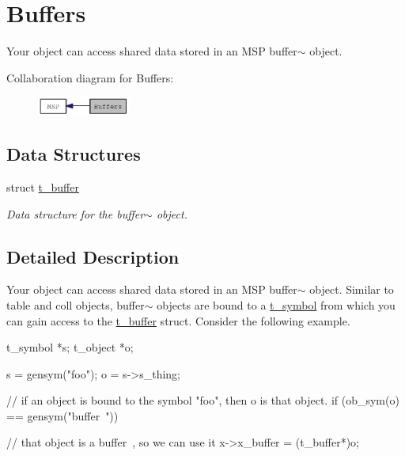 \hypertarget{group__buffers}{
\section{Buffers}
\label{group__buffers}
}


Your object can access shared data stored in an MSP buffer$\sim$ object.  


Collaboration diagram for Buffers:\nopagebreak
\begin{figure}[H]
\begin{center}
\leavevmode
\includegraphics[width=86pt]{group__buffers}
\end{center}
\end{figure}
\subsection*{Data Structures}
\begin{DoxyCompactItemize}
\item 
struct \hyperlink{structt__buffer}{t\_\-buffer}
\begin{DoxyCompactList}\small\item\em Data structure for the buffer$\sim$ object. \item\end{DoxyCompactList}\end{DoxyCompactItemize}


\subsection{Detailed Description}
Your object can access shared data stored in an MSP buffer$\sim$ object. Similar to table and coll objects, buffer$\sim$ objects are bound to a \hyperlink{structt__symbol}{t\_\-symbol} from which you can gain access to the \hyperlink{structt__buffer}{t\_\-buffer} struct. Consider the following example.


\begin{DoxyCode}
    t_symbol *s;
    t_object *o;
    
    s = gensym("foo");
    o = s->s_thing;
    
    // if an object is bound to the symbol "foo", then o is that object.
    if (ob_sym(o) == gensym("buffer~")) {
        // that object is a buffer~, so we can use it
        x->x_buffer = (t_buffer*)o;
        
    }
\end{DoxyCode}



